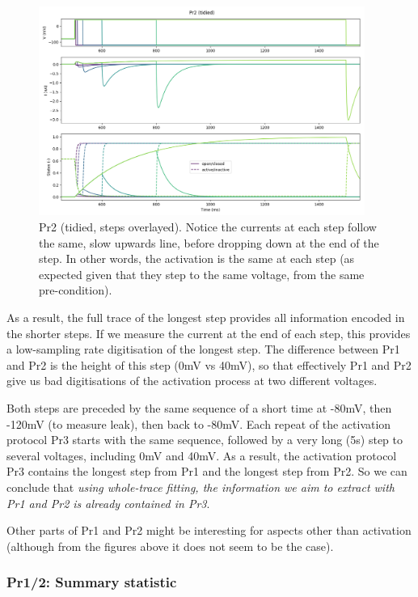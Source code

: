 \documentclass[preprint,authoryear,10pt]{elsarticle}
\begin{document}
\begin{figure}[H]
\centerline{
\includegraphics[width=0.95\textwidth]{fig/pr2-modified-folded}
}
\caption{%
Pr2 (tidied, steps overlayed).
Notice the currents at each step follow the same, slow upwards line, before
dropping down at the end of the step.
In other words, the activation is the same at each step (as expected given that
they step to the same voltage, from the same pre-condition).
}
\label{fig:analysis-pr2-folded}
\end{figure}

As a result, the full trace of the longest step provides all information
 encoded in the shorter steps.
If we measure the current at the end of each step, this provides a low-sampling
 rate digitisation of the longest step.
The difference between Pr1 and Pr2 is the height of this step (0mV vs 40mV),
 so that effectively Pr1 and Pr2 give us bad digitisations of the activation
 process at two different voltages.

Both steps are preceded by the same sequence of a short time at -80mV, then
 -120mV (to measure leak), then back to -80mV.
Each repeat of the activation protocol Pr3 starts with the same sequence,
 followed by a very long (5s) step to several voltages, including 0mV and 40mV.
As a result, the activation protocol Pr3 contains the longest step from Pr1 and
 the longest step from Pr2.
So we can conclude that \emph{using whole-trace fitting, the information we aim
 to extract with Pr1 and Pr2 is already contained in Pr3}.

Other parts of Pr1 and Pr2 might be interesting for aspects other than
 activation (although from the figures above it does not seem to be the case).

%
%
\subsubsection{Pr1/2: Summary statistic}
\end{document}
